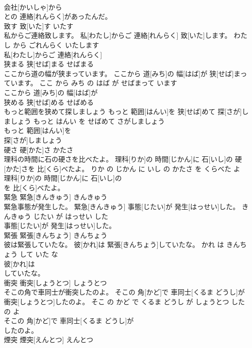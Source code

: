 \documentclass[8pt]{extreport}
\begin{document}
\begin{CJK}{UTF8}{min}
\\	会社[かいしゃ]から
\\	との 連絡[れんらく]があったんだ。			
\\	致す	致[いた]す	いたす	
\\	私からご連絡致します。	私[わたし]からご 連絡[れんらく] 致[いた]します。	わたし から ごれんらく いたします	
\\	私[わたし]からご 連絡[れんらく]
\\	狭まる	狭[せば]まる	せばまる	
\\	ここから道の幅が狭まっています。	ここから 道[みち]の 幅[はば]が 狭[せば]まっています。	ここ から みち の はば が せばまって います	
\\	ここから 道[みち]の 幅[はば]が
\\	狭める	狭[せば]める	せばめる	
\\	もっと範囲を狭めて探しましょう	もっと 範囲[はんい]を 狭[せば]めて 探[さが]しましょう	もっと はんい を せばめて さがしましょう	
\\	もっと 範囲[はんい]を
\\	探[さが]しましょう			
\\	硬さ	硬[かた]さ	かたさ	
\\	理科の時間に石の硬さを比べたよ。	理科[りか]の 時間[じかん]に 石[いし]の 硬[かた]さを 比[くら]べたよ。	りか の じかん に いし の かたさ を くらべた よ	
\\	理科[りか]の 時間[じかん]に 石[いし]の
\\	を 比[くら]べたよ。			
\\	緊急	緊急[きんきゅう]	きんきゅう	
\\	緊急事態が発生した。	緊急[きんきゅう] 事態[じたい]が 発生[はっせい]した。	きんきゅう じたい が はっせい した	
\\	事態[じたい]が 発生[はっせい]した。			
\\	緊張	緊張[きんちょう]	きんちょう	
\\	彼は緊張していたな。	彼[かれ]は 緊張[きんちょう]していたな。	かれ は きんちょう して いた な	
\\	彼[かれ]は
\\	していたな。			
\\	衝突	衝突[しょうとつ]	しょうとつ	
\\	そこの角で車同士が衝突したのよ。	そこの 角[かど]で 車同士[くるま どうし]が 衝突[しょうとつ]したのよ。	そこ の かど で くるま どうし が しょうとつ した の よ	
\\	そこの 角[かど]で 車同士[くるま どうし]が
\\	したのよ。			
\\	煙突	煙突[えんとつ]	えんとつ	

\end{CJK}
\end{document}
